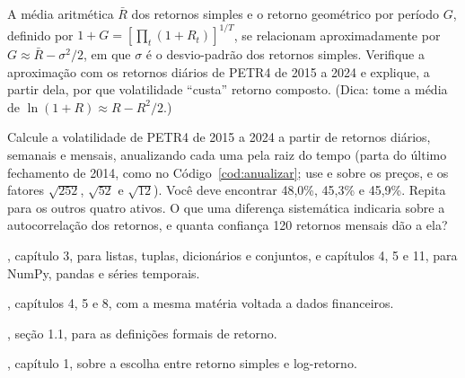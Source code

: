 \begin{exercicios}
  \item {} A média aritmética $\bar R$ dos retornos simples e o retorno geométrico por período $G$, definido por $1 + G = \left[\prod_t (1+R_t)\right]^{1/T}$, se relacionam aproximadamente por $G \approx \bar R - \sigma^2/2$, em que $\sigma$ é o desvio-padrão dos retornos simples. Verifique a aproximação com os retornos diários de PETR4 de 2015 a 2024 e explique, a partir dela, por que volatilidade ``custa'' retorno composto. (Dica: tome a média de $\ln(1+R) \approx R - R^2/2$.)
  \item\label{ex:c01-frequencia}  Calcule a volatilidade de PETR4 de 2015 a 2024 a partir de retornos diários, semanais e mensais, anualizando cada uma pela raiz do tempo (parta do último fechamento de 2014, como no Código~\ref{cod:anualizar}; use  e  sobre os preços, e os fatores $\sqrt{252}$, $\sqrt{52}$ e $\sqrt{12}$). Você deve encontrar 48,0\%, 45,3\% e 45,9\%. Repita para os outros quatro ativos. O que uma diferença sistemática indicaria sobre a autocorrelação dos retornos, e quanta confiança 120 retornos mensais dão a ela?
\end{exercicios}

\begin{leituras}
  \item \citet{mckinney2022}, capítulo 3, para listas, tuplas, dicionários e conjuntos, e capítulos 4, 5 e 11, para NumPy, pandas e séries temporais.
  \item \citet{hilpisch2018}, capítulos 4, 5 e 8, com a mesma matéria voltada a dados financeiros.
  \item \citet{tsay2010}, seção 1.1, para as definições formais de retorno.
  \item \citet{campbell1997}, capítulo 1, sobre a escolha entre retorno simples e log-retorno.
\end{leituras}
